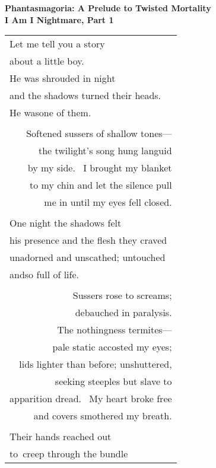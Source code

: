 \documentclass{article}
\begin{document}
\begin{center}
\textbf{Phantasmagoria: A Prelude to Twisted Mortality} \\
{\small\textbf{I Am I Nightmare, Part 1}} \\
\vspace*{2ex}
\begin{tabular}{l}
Let me tell you a story \\
about a little boy. \\
He was shrouded in night \\
and the shadows turned their heads. \\
He was\hspace*{4ex}one of them. \\
\\
\multicolumn{1}{r}{Softened sussers of shallow tones---} \\
\multicolumn{1}{r}{the twilight's song hung languid} \\
\multicolumn{1}{r}{by my side.  I brought my blanket} \\
\multicolumn{1}{r}{to my chin and let the silence pull} \\
\multicolumn{1}{r}{me in until my eyes fell closed.} \\
\\
One night the shadows felt \\
his presence and the flesh they craved \\
unadorned and unscathed; untouched \\
and\hspace*{4ex}so full of life. \\
\\
\multicolumn{1}{r}{Sussers rose to screams;} \\
\multicolumn{1}{r}{debauched in paralysis.} \\
\multicolumn{1}{r}{The nothingness termites---} \\
\multicolumn{1}{r}{pale static accosted my eyes;} \\
\multicolumn{1}{r}{lids lighter than before; unshuttered,} \\
\multicolumn{1}{r}{seeking steeples but slave to} \\
\multicolumn{1}{r}{apparition dread.  My heart broke free} \\
\multicolumn{1}{r}{and covers smothered my breath.} \\
\\
Their hands reached out \\
to creep through the bundle \\

\end{tabular}
\end{center}
\end{document}
